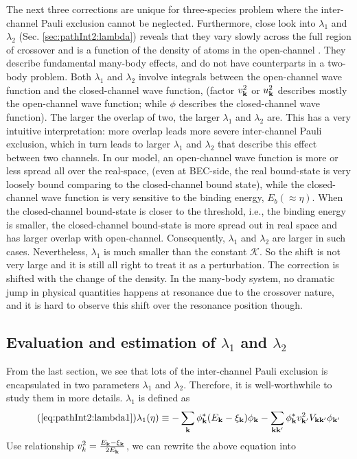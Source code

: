 The next three corrections are unique for three-species problem where the inter-channel Pauli exclusion cannot be neglected.  
Furthermore,  close look into $\lambda_1$ and $\lambda_2$ (Sec. \ref{sec:pathInt2:lambda}) reveals that they vary slowly across the full region of crossover and is a function of the density of atoms in the open-channel .  They describe  fundamental many-body effects, and do not have counterparts in a two-body problem.  
Both $\lambda_{1}$ and $\lambda_{2}$ involve integrals between the open-channel wave function and the closed-channel wave function, (factor $v_{\mathbf{k}}^{2}$ or $u_{\mathbf{k}}^{2}$ describes mostly the open-channel wave function; while $\phi$ describes the closed-channel wave function). The larger the overlap of two, the larger $\lambda_{1}$ and $\lambda_{2}$ are.  This has a very intuitive interpretation:  more overlap leads more severe inter-channel Pauli exclusion, which in turn leads to larger $\lambda_{1}$ and $\lambda_{2}$ that describe this effect between two  channels.  In our model, an open-channel wave function is more or less spread all over the real-space, (even at BEC-side, the real bound-state is very loosely bound comparing to the closed-channel bound state), while the closed-channel wave function is very sensitive to the binding energy, $E_{b}(\approx\eta)$.  When the closed-channel  bound-state is closer to the threshold, i.e.,  the binding energy  is smaller, the closed-channel bound-state is more spread out  in real space and has larger overlap with open-channel. Consequently,  $\lambda_{1}$ and $\lambda_{2}$ are larger in such cases.                           Nevertheless, $\lambda_1$ is much smaller than the  constant $\mathcal{K}$.  So the shift is not very large and it is still all right to treat it as a perturbation.  The correction is   shifted with the change of the density.  In the many-body system, no dramatic jump in physical quantities happens at resonance due to the crossover nature, and it is hard to observe this shift over the resonance position though.  %


\subsection{Evaluation and estimation of $\lambda_{1}$ and $\lambda_{2}$\label{sec:pathInt2:lambda}}
From the last section, we  see  that lots of the inter-channel Pauli exclusion is encapsulated in two parameters $\lambda_{1}$ and $\lambda_{2}$.   Therefore, it is well-worthwhile to study them in more details.  $\lambda_{1}$ is defined as 
\begin{equation}\tag{\ref{eq:pathInt2:lambda1}}
\lambda_{1}(\eta)\equiv-\sum_{\vk}{\phi_{\vk}^{*}}{(E_{\vk}-\xi_{\vk})}\phi_{\vk}
	-\sum_{\vk\vk'}{\phi_{\vk}^{*}}{v_{\vk'}^{2}V_{\vk\vk'}}\phi_{\vk'}
\end{equation}
Use relationship $v_{k}^{2}=\frac{E_{\mathbf{k}}-\xi_{\mathbf{k}}}{2E_{\mathbf{k}}}$, we can rewrite the above equation into 

